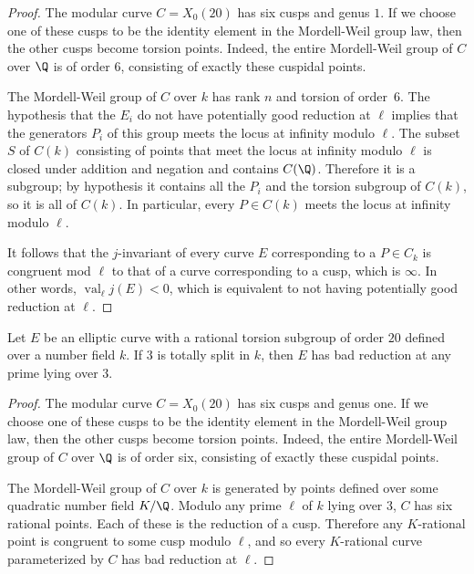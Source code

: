 \documentclass[12pt]{amsart}
\DeclareMathOperator{\val}{val}
\begin{document}
\begin{proof}
    The modular curve $C=X_0(20)$ has six cusps and genus $1$.  If we choose one of these cusps to be the identity element in the Mordell-Weil group law, then the other cusps become torsion points.  Indeed, the entire Mordell-Weil group of $C$ over $\Q$ is of order $6$, consisting of exactly these cuspidal points.

The Mordell-Weil group of $C$ over $k$ has rank $n$ and torsion of order~$6$.  
The hypothesis that the $E_i$ do not have potentially good reduction at $\ell$ implies that
the generators $P_i$ of this group meets the locus at infinity modulo $\ell$.  The subset
$S$ of $C(k)$ consisting of points that meet the locus at infinity modulo $\ell$ is closed
under addition and negation and contains $C(\Q)$.  Therefore it is a subgroup; by hypothesis
it contains all the $P_i$ and the torsion subgroup of $C(k)$, so it is all of
$C(k)$.  In particular, every $P \in C(k)$ meets the locus at infinity modulo $\ell$.

It follows that the $j$-invariant of every curve $E$ corresponding to a $P \in C_k$ is congruent
mod $\ell$ to that of a curve corresponding to a cusp, which is $\infty$.  In other words,
$\val_\ell j(E) < 0$, which is equivalent to not having potentially good reduction at $\ell$.
\end{proof}

\begin{thm}\label{general}
	Let $E$ be an elliptic curve with a rational torsion subgroup of order $20$ defined over a number field $k$.  If $3$ is totally split in $k$, then $E$ has bad reduction at any prime lying over $3$.
\end{thm}

\begin{proof} The modular curve $C=X_0(20)$ has six cusps and genus one.  If we choose one of these cusps to be the identity element in the Mordell-Weil group law, then the other cusps become torsion points.  Indeed, the entire Mordell-Weil group of $C$ over $\Q$ is of order six, consisting of exactly these cuspidal points.

The Mordell-Weil group of $C$ over $k$ is generated by points defined over some quadratic number field $K/\Q$.  Modulo any prime $\ell$ of $k$ lying over $3$, $C$ has six rational points.  Each of these is the reduction of a cusp.  Therefore any $K$-rational point is congruent to some cusp modulo $\ell$, and so every $K$-rational curve parameterized by $C$ has bad reduction at $\ell$.  
\end{proof}
\end{document}
